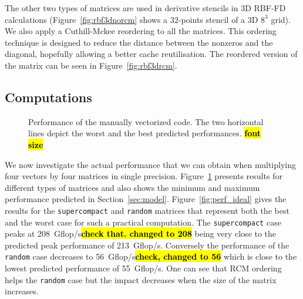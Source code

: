 \documentclass[10pt,conference,compsocconf]{IEEEtran}
\newcommand{\todo}[1]{{\color{red}\textbf{\hl{#1}}\xspace}}
\begin{document}
The other two types of matrices are used in derivative stencils in 3D
RBF-FD calculations (Figure~\ref{fig:rbf3dnorcm} shows a $32$-points
stencil of a 3D $8^3$ grid). We also apply a Cuthill-Mckee reordering to
all the matrices.  This ordering technique is designed to reduce the
distance between the nonzeros and the diagonal, hopefully allowing a
better cache reutilisation. The reordered version of the matrix can be
seen in Figure~\ref{fig:rbf3drcm}.


\subsection{Computations}

\begin{figure}[t]
  \centering
  
  \caption{Performance of the manually vectorized code. The two
    horizontal lines depict the worst and the best predicted performances. \todo{font size}}
  \label{fig:expe_types}
\end{figure}

We now investigate the actual performance that we can obtain when
multiplying four vectors by four matrices in single
precision. Figure~\ref{fig:expe_types} presents results for different
types of matrices and also shows the minimum and maximum performance
predicted in Section~\ref{sec:model}. Figure~\ref{fig:perf_ideal}
gives the results for the {\tt supercompact} and {\tt random} matrices
that represent both the best and the worst case for such a practical 
computation. The {\tt supercompact} case peaks at
208~Gflop/s\todo{check that. changed to 208} being very close to the predicted peak
performance of 213~Gflop/s. Conversely the performance of the {\tt
  random} case decreases to 56~Gflop/s\todo{check, changed to 56} which is close to
the lowest predicted performance of 55~Gflop/s. One can see that RCM
ordering helps the {\tt random} case but the impact decreases when the
size of the matrix increases.
\end{document}
